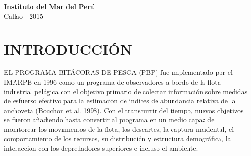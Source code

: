 \documentclass[a4paper,oneside,11pt]{book}
\begin{document}
\begin{titlepage}
\begin{center}
\begin{large}
\Large {\textbf{Instituto del Mar del Perú} \vspace{5pt}\\ Callao - 2015}
\end{large}
\end{center}
\end{titlepage}


 
\newcommand{\figura}[4]{
  \begin{figure} 
  \begin{center} 
  \texttt{[image: \#1]} 
  \caption{#3} 
  \label{#4} 
  \end{center} 
  \end{figure}} 

\newenvironment{tabla}[2]{ 
  \begin{table} 
  \begin{center} 
  \caption{#1} 
  \label{#2}}{\end{center} 
  \end{table}} 




\renewcommand{\contentsname}{CONTENIDO} 
\renewcommand{\partname}{Parte} 
\renewcommand{\chaptername}{Capítulo} 
\renewcommand{\appendixname}{Apéndice} 
\renewcommand{\bibname}{Bibliografía} 
\renewcommand{\figurename}{Figura} 
\renewcommand{\listfigurename}{Índice de figuras} 
\renewcommand{\tablename}{Tabla} 
\renewcommand{\listtablename}{Índice de tablas}  


\tableofcontents 

\chapter {INTRODUCCIÓN}

EL PROGRAMA BITÁCORAS DE PESCA (PBP) fue implementado por el IMARPE en 1996 como un programa de observadores a bordo de la flota industrial pelágica con el objetivo primario de colectar información sobre medidas de esfuerzo efectivo para la estimación de índices de abundancia relativa de la anchoveta (Bouchon et al. 1998).
Con el transcurrir del tiempo, nuevos objetivos se fueron añadiendo hasta convertir al programa en un medio capaz de monitorear los movimientos de la flota, los descartes, la captura incidental, el comportamiento de los recursos, su distribución y estructura demográfica, la interacción con los depredadores superiores e incluso el ambiente.\\
\end{document}
